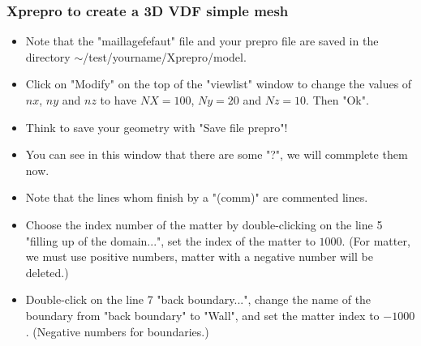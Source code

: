 \documentclass[10pt]{beamer}
\begin{document}
\begin{frame}
\frametitle{Xprepro to create a 3D VDF simple mesh}
\begin{block}{}

\begin{itemize}
\item Note that the "maillagefefaut" file and your prepro file are saved in the directory $\sim$/test/yourname/Xprepro/model.
\item Click on "Modify" on the top of the "viewlist" window to change the values of $nx$, $ny$ and $nz$ to have $NX=100$, $Ny=20$ and $Nz=10$. Then "Ok". 
\item Think to save your geometry with "Save file prepro"!
\item You can see in this window that there are some "?", we will commplete them now.
\item Note that the lines whom finish by a "(comm)" are commented lines.
\item Choose the index number of the matter by double-clicking on the line 5 "filling up of the domain...", set the index of the matter to $1000$. (For matter, we must use positive numbers, matter with a negative number will be deleted.)
\item Double-click on the line 7 "back boundary...", change the name of the boundary from "back boundary" to "Wall", and set the matter index to $-1000$. (Negative numbers for boundaries.)
\end{itemize}

\end{block}
\end{frame}
\end{document}
